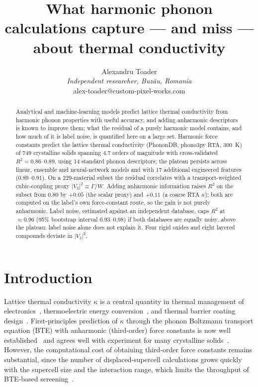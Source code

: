 \documentclass[aps,prm,reprint,onecolumn,groupedaddress]{revtex4-2}
\begin{document}
\title{What harmonic phonon calculations capture --- and miss --- about thermal conductivity}

\author{Alexandru Toader\\
\textit{Independent researcher, Buz\u{a}u, Romania}\\
alex-toader@custom-pixel-works.com}

\noaffiliation

\begin{abstract}
Analytical and machine-learning models predict lattice thermal conductivity from harmonic phonon properties with useful accuracy, and adding anharmonic descriptors is known to improve them; what the residual of a purely harmonic model contains, and how much of it is label noise, is quantified here on a large set. Harmonic force constants predict the lattice thermal conductivity (PhononDB, phono3py RTA, 300~K) of 749 crystalline solids spanning 4.7 orders of magnitude with cross-validated $R^2 = 0.86$--$0.89$, using 14 standard phonon descriptors; the plateau persists across linear, ensemble and neural-network models and with 17 additional engineered features (0.89--0.91). On a 229-material subset the residual correlates with a transport-weighted cubic-coupling proxy $|V_3|^2 \equiv \Gamma/W$. Adding anharmonic information raises $R^2$ on the subset from 0.80 by $+0.05$ (the scalar proxy) and $+0.11$ (a coarse RTA $\kappa$); both are computed on the label's own force-constant route, so the gain is not purely anharmonic. Label noise, estimated against an independent database, caps $R^2$ at $\approx 0.96$ (95\% bootstrap interval 0.93--0.98) if both databases are equally noisy, above the plateau: label noise alone does not explain it. Four rigid oxides and eight layered compounds deviate in $|V_3|^2$.
\end{abstract}

\maketitle

\section{Introduction}

Lattice thermal conductivity $\kappa$ is a central quantity in thermal management of electronics~\cite{cahill2003}, thermoelectric energy conversion~\cite{snyder2008}, and thermal barrier coating design~\cite{clarke2005}. First-principles prediction of $\kappa$ through the phonon Boltzmann transport equation (BTE) with anharmonic (third-order) force constants is now well established~\cite{li2014,togo2015} and agrees well with experiment for many crystalline solids~\cite{lindsay2016}. However, the computational cost of obtaining third-order force constants remains substantial, since the number of displaced-supercell calculations grows quickly with the supercell size and the interaction range, which limits the throughput of BTE-based screening~\cite{togo2023}.
\end{document}
